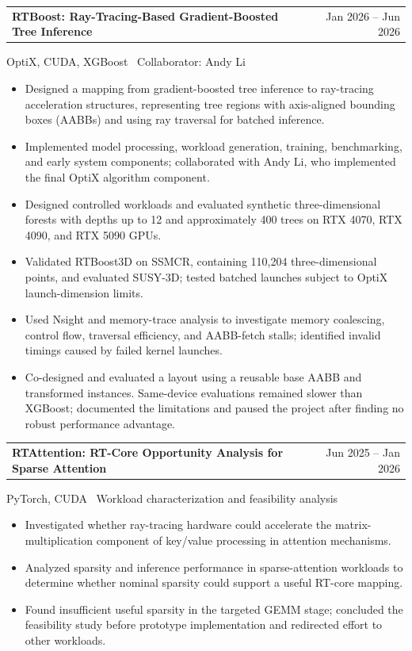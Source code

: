 \documentclass[11pt]{article}
\makeatletter
\newcommand{\resumeentry}[3]{%
  \par\addvspace{6pt}%
  \begin{tabularx}{\linewidth}{@{}>{\raggedright\arraybackslash}X@{\hspace{1em}}r@{}}%
    \textbf{#1} & {\small #2}\\%
  \end{tabularx}\par\nobreak%
  {\small #3\par}\nobreak\nopagebreak[4]%
}
\makeatother
\begin{document}
\resumeentry{RTBoost: Ray-Tracing-Based Gradient-Boosted Tree Inference}
  {Jan 2026 -- Jun 2026}
  {OptiX, CUDA, XGBoost \textbar\ Collaborator: Andy Li}
\begin{itemize}
  \item Designed a mapping from gradient-boosted tree inference to ray-tracing acceleration structures, representing tree regions with axis-aligned bounding boxes (AABBs) and using ray traversal for batched inference.
  \item Implemented model processing, workload generation, training, benchmarking, and early system components; collaborated with Andy Li, who implemented the final OptiX algorithm component.
  \item Designed controlled workloads and evaluated synthetic three-dimensional forests with depths up to 12 and approximately 400 trees on RTX 4070, RTX 4090, and RTX 5090 GPUs.
  \item Validated RTBoost3D on SSMCR, containing 110,204 three-dimensional points, and evaluated SUSY-3D; tested batched launches subject to OptiX launch-dimension limits.
  \item Used Nsight and memory-trace analysis to investigate memory coalescing, control flow, traversal efficiency, and AABB-fetch stalls; identified invalid timings caused by failed kernel launches.
  \item Co-designed and evaluated a layout using a reusable base AABB and transformed instances. Same-device evaluations remained slower than XGBoost; documented the limitations and paused the project after finding no robust performance advantage.
\end{itemize}

\resumeentry{RTAttention: RT-Core Opportunity Analysis for Sparse Attention}
  {Jun 2025 -- Jan 2026}
  {PyTorch, CUDA \textbar\ Workload characterization and feasibility analysis}
\begin{itemize}
  \item Investigated whether ray-tracing hardware could accelerate the matrix-multiplication component of key/value processing in attention mechanisms.
  \item Analyzed sparsity and inference performance in sparse-attention workloads to determine whether nominal sparsity could support a useful RT-core mapping.
  \item Found insufficient useful sparsity in the targeted GEMM stage; concluded the feasibility study before prototype implementation and redirected effort to other workloads.
\end{itemize}
\end{document}
